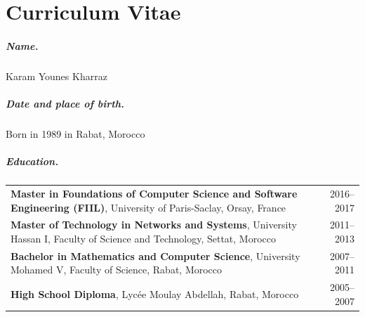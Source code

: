 \cleardoublepage
{}
\chapter*{Curriculum Vitae}

\paragraph{Name.}
Karam Younes Kharraz

\paragraph{Date and place of birth.}
Born in 1989 in Rabat, Morocco

\paragraph{Education.}\mbox{}\par\smallskip
\noindent
\renewcommand{\arraystretch}{1.5}
\begin{tabularx}{\textwidth}{@{}X r@{}}

\textbf{Master in Foundations of Computer Science and Software Engineering (FIIL)}, University of Paris-Saclay, Orsay, France & 2016--2017 \\

\textbf{Master of Technology in Networks and Systems}, University Hassan I, Faculty of Science and Technology, Settat, Morocco & 2011--2013 \\

\textbf{Bachelor in Mathematics and Computer Science}, University Mohamed V, Faculty of Science, Rabat, Morocco & 2007--2011 \\

\textbf{High School Diploma}, Lycée Moulay Abdellah, Rabat, Morocco & 2005--2007
\end{tabularx}
\renewcommand{\arraystretch}{1.2}